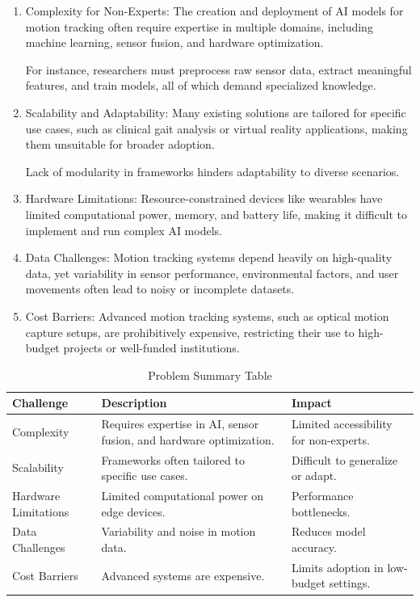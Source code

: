 \begin{enumerate}
    \item Complexity for Non-Experts:
    The creation and deployment of AI models for motion tracking often require expertise in multiple domains, including machine learning, sensor fusion, and hardware optimization.
    
    For instance, researchers must preprocess raw sensor data, extract meaningful features, and train models, all of which demand specialized knowledge.

    \item Scalability and Adaptability:
    Many existing solutions are tailored for specific use cases, such as clinical gait analysis or virtual reality applications, making them unsuitable for broader adoption.
    
    Lack of modularity in frameworks hinders adaptability to diverse scenarios.

    \item Hardware Limitations:
    Resource-constrained devices like wearables have limited computational power, memory, and battery life, making it difficult to implement and run complex AI models.

    \item Data Challenges:
    Motion tracking systems depend heavily on high-quality data, yet variability in sensor performance, environmental factors, and user movements often lead to noisy or incomplete datasets.

    \item Cost Barriers:
    Advanced motion tracking systems, such as optical motion capture setups, are prohibitively expensive, restricting their use to high-budget projects or well-funded institutions.
\end{enumerate}

\pagebreak

\begin{table}
    \centering
    \label{tab:tab_4}
    \caption{Problem Summary Table}
    \begin{tabular}{| >{\centering\arraybackslash}m{3cm} | >{\centering\arraybackslash}m{5cm} | >{\centering\arraybackslash}m{4cm} |}
        \toprule
         \textbf{Challenge} &  \textbf{Description}& \textbf{Impact}\\
         \midrule
         Complexity &  Requires expertise in AI, sensor fusion, and hardware optimization.& Limited accessibility for non-experts.\\
         \hline
         Scalability &  Frameworks often tailored to specific use cases.& Difficult to generalize or adapt.\\
         \hline
         Hardware Limitations &  Limited computational power on edge devices.& Performance bottlenecks.\\
         \hline
         Data Challenges &  Variability and noise in motion data.& Reduces model accuracy.\\
         \hline
         Cost Barriers &  Advanced systems are expensive.& Limits adoption in low-budget settings.\\
         \bottomrule
    \end{tabular}
\end{table}

